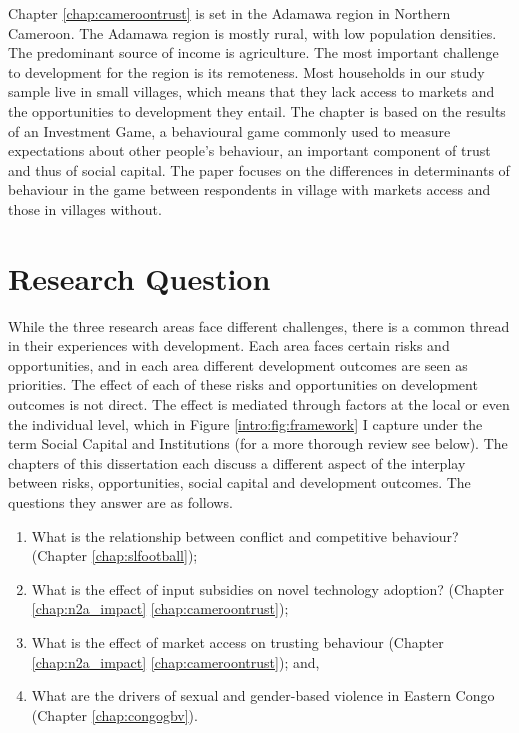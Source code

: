 Chapter \ref{chap:cameroontrust} is set in the Adamawa region in Northern Cameroon. The Adamawa region is mostly rural, with low population densities. The predominant source of income is agriculture. The most important challenge to development for the region is its remoteness. Most households in our study sample live in small villages, which means that they lack access to markets and the opportunities to development they entail. The chapter is based on the results of an Investment Game, a behavioural game commonly used to measure expectations about other people's behaviour, an important component of trust and thus of social capital. The paper focuses on the differences in determinants of behaviour in the game between respondents in village with markets access and those in villages without.





\section{Research Question}
While the three research areas face different challenges, there is a common thread in their experiences with development. Each area faces certain risks and opportunities, and in each area different development outcomes are seen as priorities. The effect of each of these risks and opportunities on development outcomes is not direct. The effect is mediated through factors at the local or even the individual level, which in Figure \ref{intro:fig:framework} I capture under the term Social Capital and Institutions (for a more thorough review see below).  The chapters of this dissertation each discuss a different aspect of the interplay between risks, opportunities, social capital and development outcomes. The questions they answer are as follows.
\begin{enumerate}
	\item What is the relationship between conflict and competitive behaviour? (Chapter \ref{chap:slfootball});
	\item What is the effect of input subsidies on novel technology adoption? (Chapter \ref{chap:n2a_impact}
\ref{chap:cameroontrust});
	\item What is the effect of market access on trusting behaviour (Chapter \ref{chap:n2a_impact}
\ref{chap:cameroontrust}); and,
	\item What are the drivers of sexual and gender-based violence in Eastern Congo (Chapter \ref{chap:congogbv}).
\end{enumerate}


